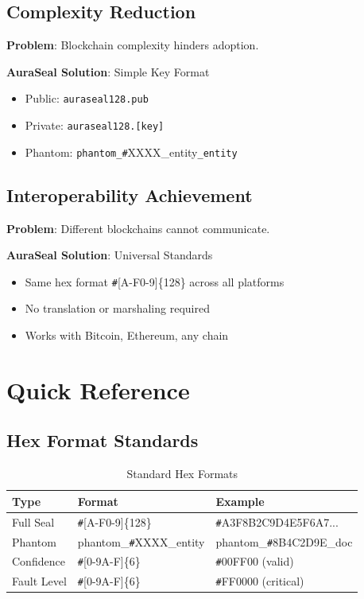 \documentclass[12pt,a4paper]{report}
\theoremstyle{definition}
\newcommand{\hex}[1]{\texttt{\#}#1}
\newcommand{\phantomindex}[1]{\texttt{phantom\_\#}#1\texttt{\_entity}}
\begin{document}
\section{Complexity Reduction}

\textbf{Problem}: Blockchain complexity hinders adoption.

\textbf{AuraSeal Solution}: Simple Key Format
\begin{itemize}
    \item Public: \texttt{auraseal128.pub}
    \item Private: \texttt{auraseal128.[key]}
    \item Phantom: \phantomindex{XXXX\_entity}
\end{itemize}

\section{Interoperability Achievement}

\textbf{Problem}: Different blockchains cannot communicate.

\textbf{AuraSeal Solution}: Universal Standards
\begin{itemize}
    \item Same hex format \hex{[A-F0-9]\{128\}} across all platforms
    \item No translation or marshaling required
    \item Works with Bitcoin, Ethereum, any chain
\end{itemize}


\appendix

\chapter{Quick Reference}

\section{Hex Format Standards}

\begin{table}[h]
\centering
\caption{Standard Hex Formats}
\begin{tabular}{|l|l|l|}
\hline
\textbf{Type} & \textbf{Format} & \textbf{Example} \\
\hline
Full Seal & \hex{[A-F0-9]\{128\}} & \hex{A3F8B2C9D4E5F6A7...} \\
Phantom & phantom\_\hex{XXXX}\_entity & phantom\_\hex{8B4C2D9E}\_doc \\
Confidence & \hex{[0-9A-F]\{6\}} & \hex{00FF00} (valid) \\
Fault Level & \hex{[0-9A-F]\{6\}} & \hex{FF0000} (critical) \\
\hline
\end{tabular}
\end{table}
\end{document}
